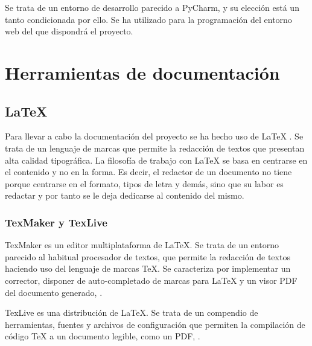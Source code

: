 Se trata de un entorno de desarrollo parecido a PyCharm, y su elección está un tanto condicionada por ello. Se ha utilizado para la programación del entorno web del que dispondrá el proyecto. 

\section{Herramientas de documentación}

\subsection{\LaTeX}

Para llevar a cabo la documentación del proyecto se ha hecho uso de \LaTeX{} \citep{wiki:latex}. Se trata de un lenguaje de marcas que permite la redacción de textos que presentan alta calidad tipográfica. La filosofía de trabajo con \LaTeX{} se basa en centrarse en el contenido y no en la forma. Es decir, el redactor de un documento no tiene porque centrarse en el formato, tipos de letra y demás, sino que su labor es redactar y por tanto se le deja dedicarse al contenido del mismo.

\subsubsection{TexMaker y TexLive}
TexMaker es un editor multiplataforma de \LaTeX. Se trata de un entorno parecido al habitual procesador de textos, que permite la redacción de textos haciendo uso del lenguaje de marcas \TeX. Se caracteriza por implementar un corrector, disponer de auto-completado de marcas para \LaTeX{} y un visor PDF del documento generado, \citep{wiki:TexMaker}.

TexLive es una distribución de \LaTeX. Se trata de un compendio de herramientas, fuentes y archivos de configuración que permiten la compilación de código \TeX{} a un documento legible, como un PDF, \citep{wiki:TexLive}.






